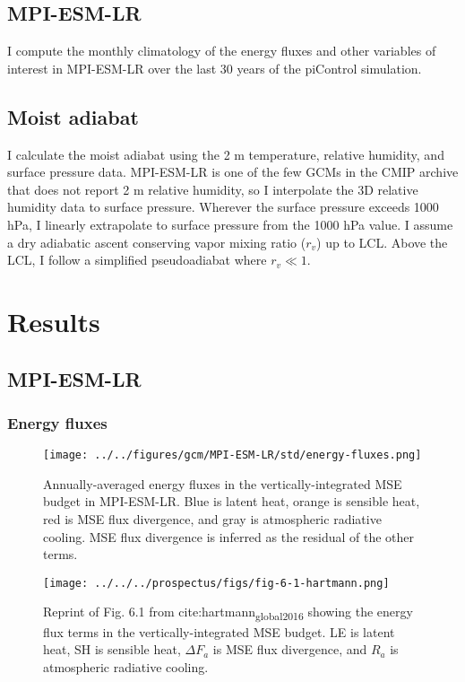 \documentclass[11pt]{article}
\begin{document}
\subsection{MPI-ESM-LR}
\label{sec:org2613404}
I compute the monthly climatology of the energy fluxes and other variables of interest in MPI-ESM-LR over the last 30 years of the piControl simulation.

\subsection{Moist adiabat}
\label{sec:orgff29c17}
I calculate the moist adiabat using the 2 m temperature, relative humidity, and surface pressure data. MPI-ESM-LR is one of the few GCMs in the CMIP archive that does not report 2 m relative humidity, so I interpolate the 3D relative humidity data to surface pressure. Wherever the surface pressure exceeds 1000 hPa, I linearly extrapolate to surface pressure from the 1000 hPa value. I assume a dry adiabatic ascent conserving vapor mixing ratio (\(r_v\)) up to LCL. Above the LCL, I follow a simplified pseudoadiabat where \(r_v \ll 1\).

\section{Results}
\label{sec:orgb38297f}
\subsection{MPI-ESM-LR}
\label{sec:org8814364}
\subsubsection{Energy fluxes}
\label{sec:org4f7595a}

\begin{figure}[htbp]
\centering
\texttt{[image: ../../figures/gcm/MPI-ESM-LR/std/energy-fluxes.png]}
\caption{\label{fig:org9bca2ab}Annually-averaged energy fluxes in the vertically-integrated MSE budget in MPI-ESM-LR. Blue is latent heat, orange is sensible heat, red is MSE flux divergence, and gray is atmospheric radiative cooling. MSE flux divergence is inferred as the residual of the other terms.}
\end{figure}

\begin{figure}[htbp]
\centering
\texttt{[image: ../../../prospectus/figs/fig-6-1-hartmann.png]}
\caption{\label{fig:orgf05a71d}Reprint of Fig. 6.1 from cite:hartmann\textsubscript{global}\textsubscript{2016} showing the energy flux terms in the vertically-integrated MSE budget. LE is latent heat, SH is sensible heat, \(\Delta F_a\) is MSE flux divergence, and \(R_a\) is atmospheric radiative cooling.}
\end{figure}
\end{document}
